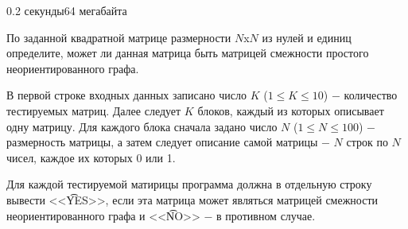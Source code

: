 \begin{problem}{}{}{}{0.2 секунды}{64 мегабайта}

По заданной квадратной матрице размерности $N$x$N$ из нулей и единиц определите, 
может ли данная матрица быть матрицей смежности простого неориентированного графа.

\InputFile
В первой строке входных данных записано число $K$ ($1 \le K \le 10$) $-$ количество тестируемых матриц. Далее следует $K$
блоков, каждый из которых описывает одну матрицу. Для каждого блока сначала задано число $N$ ($1 \le N \le 100$) $-$ 
размерность матрицы, а затем следует описание самой матрицы $-$ $N$ строк по $N$ чисел, каждое их которых 0 или 1.

\OutputFile
Для каждой тестируемой матирицы программа должна в отдельную строку вывести <<{\t{YES}}>>, если эта матрица 
может являться матрицей смежности неориентированного графа и <<{\t{NO}}>> $-$ в противном случае.

\Example

\begin{example}
%
\end{example}

\end{problem}
